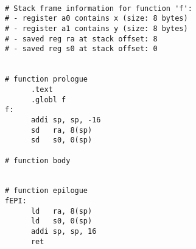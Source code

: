 
\begin{verbatim}

# Stack frame information for function 'f':
# - register a0 contains x (size: 8 bytes)
# - register a1 contains y (size: 8 bytes)
# - saved reg ra at stack offset: 8
# - saved reg s0 at stack offset: 0


# function prologue
      .text
      .globl f
f:
      addi sp, sp, -16
      sd   ra, 8(sp)
      sd   s0, 0(sp)

# function body


# function epilogue
fEPI:
      ld   ra, 8(sp)
      ld   s0, 0(sp)
      addi sp, sp, 16
      ret
\end{verbatim}